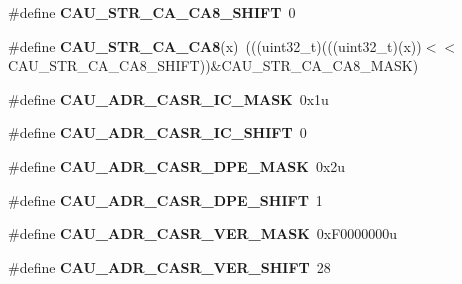 \begin{DoxyCompactItemize}
\item 
\#define {\bfseries C\+A\+U\+\_\+\+S\+T\+R\+\_\+\+C\+A\+\_\+\+C\+A8\+\_\+\+S\+H\+I\+FT}~0\hypertarget{group__CAU__Register__Masks_ga7ca88815b2d128a4164b3e14953ed7f2}{}\label{group__CAU__Register__Masks_ga7ca88815b2d128a4164b3e14953ed7f2}

\item 
\#define {\bfseries C\+A\+U\+\_\+\+S\+T\+R\+\_\+\+C\+A\+\_\+\+C\+A8}(x)~(((uint32\+\_\+t)(((uint32\+\_\+t)(x))$<$$<$C\+A\+U\+\_\+\+S\+T\+R\+\_\+\+C\+A\+\_\+\+C\+A8\+\_\+\+S\+H\+I\+FT))\&C\+A\+U\+\_\+\+S\+T\+R\+\_\+\+C\+A\+\_\+\+C\+A8\+\_\+\+M\+A\+SK)\hypertarget{group__CAU__Register__Masks_gace7494bdf03c7abbe72b1f15b8a596ce}{}\label{group__CAU__Register__Masks_gace7494bdf03c7abbe72b1f15b8a596ce}

\item 
\#define {\bfseries C\+A\+U\+\_\+\+A\+D\+R\+\_\+\+C\+A\+S\+R\+\_\+\+I\+C\+\_\+\+M\+A\+SK}~0x1u\hypertarget{group__CAU__Register__Masks_ga5c604aca577b3d7a07e03e6b98ae418f}{}\label{group__CAU__Register__Masks_ga5c604aca577b3d7a07e03e6b98ae418f}

\item 
\#define {\bfseries C\+A\+U\+\_\+\+A\+D\+R\+\_\+\+C\+A\+S\+R\+\_\+\+I\+C\+\_\+\+S\+H\+I\+FT}~0\hypertarget{group__CAU__Register__Masks_ga0659a788cbcc596dc60f7d85104ade27}{}\label{group__CAU__Register__Masks_ga0659a788cbcc596dc60f7d85104ade27}

\item 
\#define {\bfseries C\+A\+U\+\_\+\+A\+D\+R\+\_\+\+C\+A\+S\+R\+\_\+\+D\+P\+E\+\_\+\+M\+A\+SK}~0x2u\hypertarget{group__CAU__Register__Masks_gac2aa12b2fd1060e7b5c444cb64efbcf6}{}\label{group__CAU__Register__Masks_gac2aa12b2fd1060e7b5c444cb64efbcf6}

\item 
\#define {\bfseries C\+A\+U\+\_\+\+A\+D\+R\+\_\+\+C\+A\+S\+R\+\_\+\+D\+P\+E\+\_\+\+S\+H\+I\+FT}~1\hypertarget{group__CAU__Register__Masks_gac342820577edd24d5b9b2ffe7279c18a}{}\label{group__CAU__Register__Masks_gac342820577edd24d5b9b2ffe7279c18a}

\item 
\#define {\bfseries C\+A\+U\+\_\+\+A\+D\+R\+\_\+\+C\+A\+S\+R\+\_\+\+V\+E\+R\+\_\+\+M\+A\+SK}~0x\+F0000000u\hypertarget{group__CAU__Register__Masks_gabb62168b08dff77e1dd30ca4cb6cd997}{}\label{group__CAU__Register__Masks_gabb62168b08dff77e1dd30ca4cb6cd997}

\item 
\#define {\bfseries C\+A\+U\+\_\+\+A\+D\+R\+\_\+\+C\+A\+S\+R\+\_\+\+V\+E\+R\+\_\+\+S\+H\+I\+FT}~28\hypertarget{group__CAU__Register__Masks_ga22dcce65fce4ef3511615cbd4d1a0e1e}{}\label{group__CAU__Register__Masks_ga22dcce65fce4ef3511615cbd4d1a0e1e}


\end{DoxyCompactItemize}

